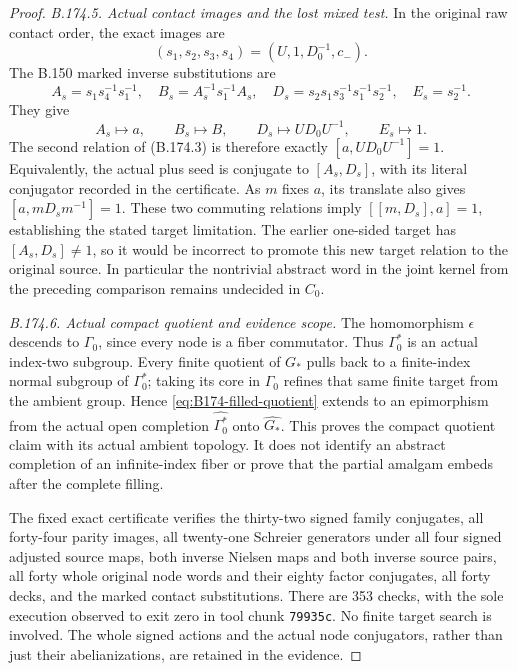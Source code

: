 \begin{proof}
\emph{B.174.5. Actual contact images and the lost mixed test.}
In the original raw contact order, the exact images are
\[
 (s_1,s_2,s_3,s_4)=(U,1,D_0^{-1},c_-).
\]
The B.150 marked inverse substitutions are
\[
 A_s=s_1s_4^{-1}s_1^{-1},\quad
 B_s=A_s^{-1}s_1^{-1}A_s,\quad
 D_s=s_2s_1s_3^{-1}s_1^{-1}s_2^{-1},\quad E_s=s_2^{-1}.
\]
They give
\begin{equation}\label{eq:B174-contacts}
 A_s\longmapsto a,\qquad B_s\longmapsto B,\qquad
 D_s\longmapsto UD_0U^{-1},\qquad E_s\longmapsto1.
\end{equation}
The second relation of (B.174.3) is therefore exactly
\([a,UD_0U^{-1}]=1\). Equivalently, the actual plus seed is
conjugate to \([A_s,D_s]\), with its literal conjugator recorded
in the certificate. As \(m\) fixes \(a\), its translate also
gives \([a,mD_sm^{-1}]=1\). These two commuting relations imply
\([[m,D_s],a]=1\), establishing the stated target limitation.
The earlier one-sided target has \([A_s,D_s]\ne1\), so it would
be incorrect to promote this new target relation to the original
source. In particular the nontrivial abstract word in the joint
kernel from the preceding comparison remains undecided in \(C_0\).

\emph{B.174.6. Actual compact quotient and evidence scope.}
The homomorphism \(\epsilon\) descends to \(\Gamma _0\), since
every node is a fiber commutator. Thus \(\Gamma _0^*\) is an
actual index-two subgroup. Every finite quotient of \(G_*\) pulls
back to a finite-index normal subgroup of \(\Gamma _0^*\);
taking its core in \(\Gamma _0\) refines that same finite target
from the ambient group. Hence \eqref{eq:B174-filled-quotient}
extends to an epimorphism from the actual open completion
\(\widehat{\Gamma _0^*}\) onto \(\widehat{G_*}\).
This proves the compact quotient claim with its actual ambient
topology. It does not identify an abstract completion of an
infinite-index fiber or prove that the partial amalgam embeds after
the complete filling.

The fixed exact certificate verifies the thirty-two signed family
conjugates, all forty-four parity images, all twenty-one Schreier
generators under all four signed adjusted source maps, both inverse
Nielsen maps and both inverse source pairs, all forty whole original
node words and their eighty factor conjugates, all forty decks, and
the marked contact substitutions. There are 353 checks, with the
sole execution observed to exit zero in tool chunk \texttt{79935c}.
No finite target search is involved. The whole signed actions and
the actual node conjugators, rather than just their abelianizations,
are retained in the evidence.
\end{proof}

